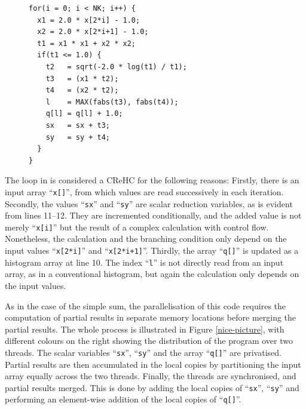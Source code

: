 \begin{figure}[h]
\begin{lstlisting}[language=MyCpp, label={complex-reduction-figure}, caption=
   {Example of a Complex Reduction and Histogram Computation:
    The bottleneck from the NAS Parallel Benchmarks can be parallelised as a
    reduction by privatising ``{\tt sx}'', ``{\tt sy}'', ``{\tt q[]}''.}]
for(i = 0; i < NK; i++) {
  x1 = 2.0 * x[2*i] - 1.0;
  x2 = 2.0 * x[2*i+1] - 1.0;
  t1 = x1 * x1 + x2 * x2;
  if(t1 <= 1.0) {
    t2   = sqrt(-2.0 * log(t1) / t1);
    t3   = (x1 * t2);
    t4   = (x2 * t2);
    l    = MAX(fabs(t3), fabs(t4));
    q[l] = q[l] + 1.0;
    sx   = sx + t3;
    sy   = sy + t4;
  }
}
\end{lstlisting}
\end{figure}

    The loop in  is considered a CReHC for the
    following reasons:
    Firstly, there is an input array ``{\tt x[]}'', from which values are read
    successively in each iteration.
    Secondly, the values ``{\tt sx}'' and ``{\tt sy}'' are scalar reduction
    variables, as is evident from lines 11--12.
    They are incremented conditionally, and the added value is not merely
    ``{\tt x[i]}'' but the result of a complex calculation with control flow.
    Nonetheless, the calculation and the branching condition only depend on the
    input values ``{\tt x[2*i]}'' and ``{\tt x[2*i+1]}''.
    Thirdly, the array ``{\tt q[]}'' is updated as a histogram array at line 10.
    The index ``{\tt l}'' is not directly read from an input array, as in a
    conventional histogram, but again the calculation only depends on the input
    values.

    As in the case of the simple sum, the parallelisation of this code
    requires the computation of partial results in separate memory locations
    before merging the partial results.
    The whole process is illustrated in Figure \ref{nice-picture}, with
    different colours on the right showing the distribution of the program
    over two threads.
    The scalar variables ``{\tt sx}'', ``{\tt sy}'' and the array ``{\tt q[]}''
    are privatised.
    Partial results are then accumulated in the local copies by partitioning the
    input array equally across the two threads. 
    Finally, the threads are synchronised, and partial results merged.
    This is done by adding the local copies of ``{\tt sx}'', ``{\tt sy}'' and
    performing an element-wise addition of the local copies of ``{\tt q[]}''. 

